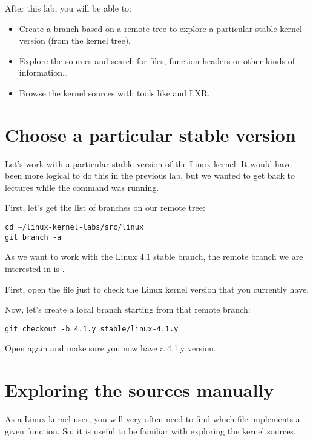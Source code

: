 
After this lab, you will be able to:

\begin{itemize}

\item Create a branch based on a remote tree to explore a particular
      stable kernel version (from the  kernel tree).
\item Explore the sources and search for files, function headers or
  other kinds of information\ldots
\item Browse the kernel sources with tools like  and LXR.
\end{itemize}

\section{Choose a particular stable version}

Let's work with a particular stable version of the Linux kernel.
It would have been more logical to do this in the previous lab, but we
wanted to get back to lectures while the  command was
running.

First, let's get the list of branches on our  remote tree:

\begin{verbatim}
cd ~/linux-kernel-labs/src/linux
git branch -a
\end{verbatim}

As we want to work with the Linux 4.1 stable branch, the remote branch
we are interested in is .

First, open the  file just to check the Linux kernel
version that you currently have.

Now, let's create a local branch starting from that remote branch:
\begin{verbatim}
git checkout -b 4.1.y stable/linux-4.1.y
\end{verbatim}

Open  again and make sure you now have a 4.1.y version.

\section{Exploring the sources manually}

As a Linux kernel user, you will very often need to find which file
implements a given function. So, it is useful to be familiar with
exploring the kernel sources.

